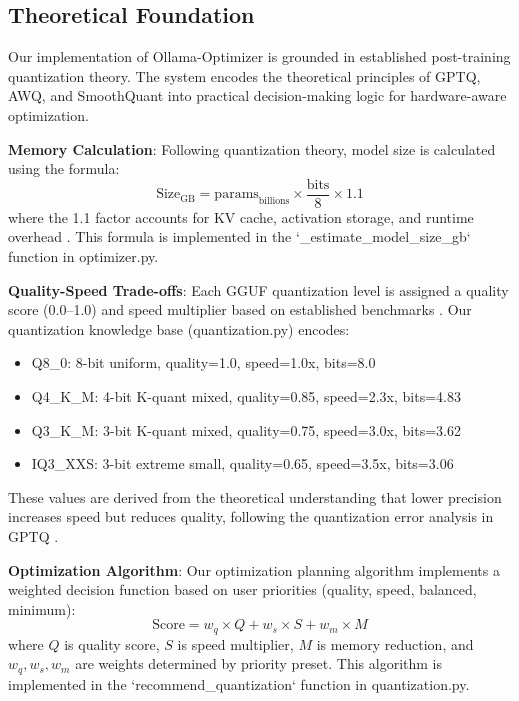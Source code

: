 \documentclass[journal]{IEEEtran}
\begin{document}
\subsection{Theoretical Foundation}

Our implementation of Ollama-Optimizer is grounded in established post-training quantization theory. The system encodes the theoretical principles of GPTQ, AWQ, and SmoothQuant into practical decision-making logic for hardware-aware optimization.

\textbf{Memory Calculation}: Following quantization theory, model size is calculated using the formula:
\begin{equation}
\text{Size}_{\text{GB}} = \text{params}_{\text{billions}} \times \frac{\text{bits}}{8} \times 1.1
\end{equation}
where the 1.1 factor accounts for KV cache, activation storage, and runtime overhead \cite{frantar2022}. This formula is implemented in the `_estimate_model_size_gb` function in optimizer.py.

\textbf{Quality-Speed Trade-offs}: Each GGUF quantization level is assigned a quality score (0.0--1.0) and speed multiplier based on established benchmarks \cite{llamacpp2023}. Our quantization knowledge base (quantization.py) encodes:
\begin{itemize}
    \item Q8_0: 8-bit uniform, quality=1.0, speed=1.0x, bits=8.0
    \item Q4_K_M: 4-bit K-quant mixed, quality=0.85, speed=2.3x, bits=4.83
    \item Q3_K_M: 3-bit K-quant mixed, quality=0.75, speed=3.0x, bits=3.62
    \item IQ3_XXS: 3-bit extreme small, quality=0.65, speed=3.5x, bits=3.06
\end{itemize}

These values are derived from the theoretical understanding that lower precision increases speed but reduces quality, following the quantization error analysis in GPTQ \cite{frantar2022}.

\textbf{Optimization Algorithm}: Our optimization planning algorithm implements a weighted decision function based on user priorities (quality, speed, balanced, minimum):
\begin{equation}
\text{Score} = w_q \times Q + w_s \times S + w_m \times M
\end{equation}
where $Q$ is quality score, $S$ is speed multiplier, $M$ is memory reduction, and $w_q, w_s, w_m$ are weights determined by priority preset. This algorithm is implemented in the `recommend_quantization` function in quantization.py.
\end{document}
